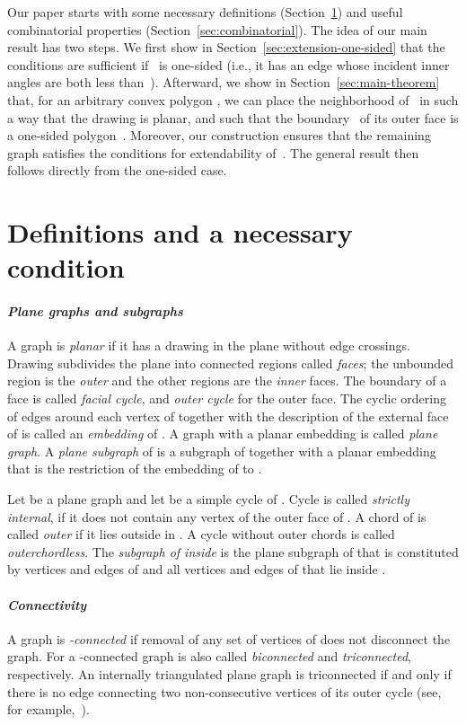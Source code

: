 \documentclass{llncs}
\begin{document}
Our paper starts with some necessary definitions (Section~\ref{sec:definitions}) and useful combinatorial properties (Section~\ref{sec:combinatorial}). The idea of our main result has two steps. We first show in Section~\ref{sec:extension-one-sided} that the conditions are sufficient if~ is one-sided (i.e., it has an edge whose incident inner angles are both less than~).  Afterward, we show in Section~\ref{sec:main-theorem} that, for an arbitrary convex polygon , we can place the neighborhood of~ in such a way that
the drawing is planar, and such that the boundary~ of its outer face is a
one-sided polygon~.  Moreover, our construction ensures
that the remaining graph satisfies the conditions for extendability
of~.  The general result then follows directly from the one-sided case. 



\section{Definitions and a necessary condition}
\label{sec:definitions}

\paragraph{\emph{\bf Plane graphs and subgraphs}} A graph  is \emph{planar} if it has a drawing  in the plane 
without edge crossings. Drawing  subdivides the plane into
connected regions called \emph{faces}; the unbounded region is the
\emph{outer} and the other regions are the \emph{inner} faces.
The boundary of a face is called \emph{facial cycle}, and \emph{outer cycle} for the outer face. 
The cyclic ordering of edges around each vertex of  together
with the description of the external face of   is called
an \emph{embedding} of . A graph  with a planar
embedding is called \emph{plane graph}. A \emph{plane subgraph}  of  
is a subgraph of  together with a planar embedding that is the restriction of 
the embedding of  to . 

Let  be a plane graph and let  be a simple cycle of . Cycle  is called \emph{strictly internal}, if it does not contain any vertex of the outer face of .
A chord of  is called \emph{outer} if it lies outside  in . A cycle without outer chords is called \emph{outerchordless}. 
The \emph{subgraph of  inside } is the plane subgraph of  that is constituted by vertices and edges of  and all vertices and edges of  that lie inside .

\paragraph{\emph{\bf Connectivity}} A graph  is \emph{-connected}
if removal of any set of  vertices of  does not disconnect the graph. For  a
-connected graph is also called \emph{biconnected} and
\emph{triconnected}, respectively. 
An internally triangulated plane graph is triconnected if and only if there is no edge connecting two non-consecutive vertices of its outer cycle (see, for example,~\cite{Avis96}).
\end{document}
